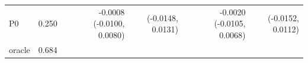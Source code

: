 \begin{tabular}{lrrrrr}
P0 & 0.250 & -0.0008 (-0.0100, 0.0080) & (-0.0148, 0.0131) & -0.0020 (-0.0105, 0.0068) & (-0.0152, 0.0112) \\
oracle & 0.684 &  &  &  &  \\
\bottomrule
\end{tabular}
